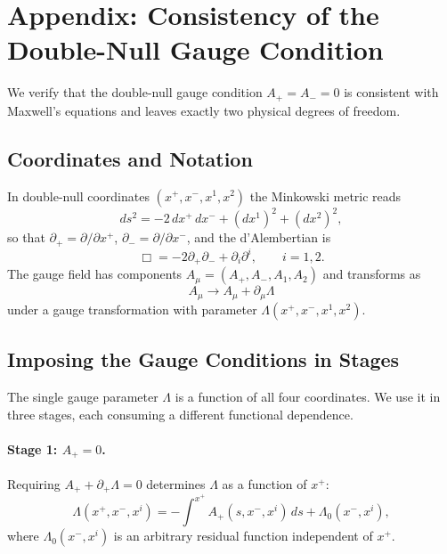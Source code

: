 \documentclass[12pt,a4paper]{article}
\begin{document}

\section{Appendix: Consistency of the Double-Null Gauge Condition}
\label{gauge_consistency}

We verify that the double-null gauge condition $A_+ = A_- = 0$ is consistent with 
Maxwell's equations and leaves exactly two physical degrees of freedom.

\subsection{Coordinates and Notation}

In double-null coordinates $(x^+, x^-, x^1, x^2)$ the Minkowski metric reads
\begin{equation}
    ds^2 = -2\,dx^+\,dx^- + (dx^1)^2 + (dx^2)^2,
\end{equation}
so that $\partial_+ = \partial/\partial x^+$, $\partial_- = \partial/\partial x^-$, and 
the d'Alembertian is
\begin{equation}
    \Box = -2\partial_+\partial_- + \partial_i\partial^i, \qquad i = 1,2.
\end{equation}
The gauge field has components $A_\mu = (A_+, A_-, A_1, A_2)$ and transforms as
\begin{equation}
    A_\mu \to A_\mu + \partial_\mu\Lambda
\end{equation}
under a gauge transformation with parameter $\Lambda(x^+, x^-, x^1, x^2)$.

\subsection{Imposing the Gauge Conditions in Stages}

The single gauge parameter $\Lambda$ is a function of all four coordinates. We use 
it in three stages, each consuming a different functional dependence.

\paragraph{Stage 1: $A_+ = 0$.}
Requiring $A_+ + \partial_+\Lambda = 0$ determines $\Lambda$ as a function of $x^+$:
\begin{equation}
    \Lambda(x^+, x^-, x^i) = -\int^{x^+} A_+(s, x^-, x^i)\,ds 
                              + \Lambda_0(x^-, x^i),
\end{equation}
where $\Lambda_0(x^-, x^i)$ is an arbitrary residual function independent of $x^+$.
\end{document}
